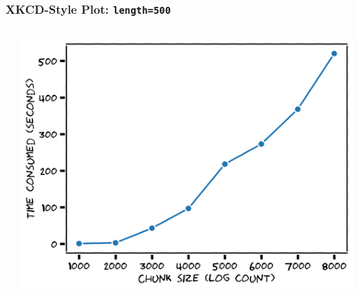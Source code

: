 \documentclass[xcolor={svgnames}]{beamer}
\newcommand{\pyfile}[2][]{}
\begin{document}
\begin{frame}[t,fragile]
    \frametitle{XKCD-Style Plot: \texttt{length=500}}
    \vspace{-2mm}
    \begin{columns}[T]
        \begin{column}{0.49\textwidth}
            \pyfile[style=footnotesize]{examples/xkcd-6.py}
        \end{column}
        \begin{column}{0.51\textwidth}
            \includegraphics[width=\textwidth]{img/xkcd-6.png}
        \end{column}
    \end{columns}
\end{frame}
\end{document}
